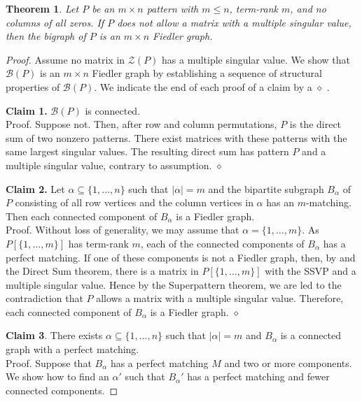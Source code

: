 \documentclass[preprint,12pt]{elsarticle}
\newtheorem{theorem}{Theorem}[section]
\begin{document}
\begin{theorem}
\label{bcaterpillars}
Let $P$ be an $m\times n$ pattern with $m\leq n$, term-rank $m$, 
and no columns of all zeros. If $P$ does not allow a matrix with a multiple singular value, then the bigraph of $P$ 
is an $m\times n$ Fiedler graph. 
\end{theorem}
\begin{proof}
   Assume no matrix in $\mathcal{Z}(P)$ 
  has a multiple singular value.  We show that $\mathcal{B}(P)$ is an $m\times n$
  Fiedler graph by establishing a sequence of structural properties of 
  $\mathcal{B}(P)$.  We indicate the end of each proof of a claim by a $\diamond$ .

\bigskip\noindent
{\bf Claim 1.} $\mathcal{B}(P)$ is connected. 
\\[12pt]
    Proof. Suppose not.  Then, after row and column permutations, 
    $P$ is  the direct sum of two nonzero patterns.  There exist matrices with these patterns with the same largest singular values. The resulting direct sum has pattern $P$ and a multiple singular value, contrary to assumption. \hfill $\diamond$ 

\bigskip\noindent
{\bf Claim 2.} Let $\alpha \subseteq \{1,\ldots, n\}$ such that 
$|\alpha|=m$ and the bipartite subgraph $B_{\alpha}$ of $P$ consisting of all row vertices 
and the column vertices in $\alpha$ has an $m$-matching.
Then each connected component of  $B_{\alpha}$
is a Fiedler graph.
\\ [12pt]
Proof. Without loss of generality, we may assume that $\alpha=\{1,\ldots, m\}$.
As $P[\{1,\ldots,m\}]$ has term-rank $m$, each of the connected components of $B_{\alpha}$ 
has a perfect matching.  If one of these components is not a Fiedler graph, then, by    and the Direct Sum theorem, there is 
a matrix in $P[\{1,\ldots,m\}]$  with the SSVP and a multiple singular 
value. Hence by the Superpattern theorem, we are led to the contradiction that $P$ allows a matrix with a multiple singular value.
Therefore, each connected component of $B_{\alpha}$ is a Fiedler graph. \hfill $\diamond$ 

\bigskip\noindent
{\bf Claim 3}.
There exists $\alpha \subseteq \{1,\ldots, n\}$ such that 
$|\alpha|=m$ and $B_{\alpha}$ is a connected graph with a perfect matching. 
\\ [12pt]
Proof. Suppose that $B_{\alpha}$ has a perfect matching $M$ and two or more components.
We show how to find an $\alpha'$ such that $B_{\alpha}'$ has a perfect matching 
and fewer connected components. 


\end{proof}
\end{document}
